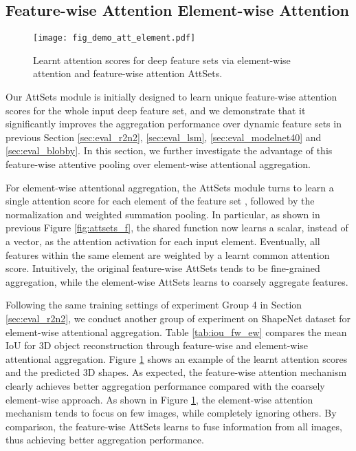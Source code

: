 \documentclass[twocolumn]{svjour3}    \pdfoutput=1
\newcommand{\nickname}{AttSets}
\begin{document}
\vspace{-0.45cm}
\subsection{Feature-wise Attention  Element-wise Attention}
\begin{figure}\vspace{-0.15cm}
\centering
   \texttt{[image: fig\_demo\_att\_element.pdf]}
\caption{Learnt attention scores for deep feature sets via element-wise attention and feature-wise attention \nickname{}.}
\label{fig:atts_ele}
\vspace{-0.5cm}
\end{figure}

Our \nickname{} module is initially designed to learn unique feature-wise attention scores for the whole input deep feature set, and we demonstrate that it significantly improves the aggregation performance over dynamic feature sets in previous Section \ref{sec:eval_r2n2}, \ref{sec:eval_lsm}, \ref{sec:eval_modelnet40} and \ref{sec:eval_blobby}. In this section, we further investigate the advantage of this feature-wise attentive pooling over element-wise attentional aggregation.

For element-wise attentional aggregation, the \nickname{} module turns to learn a single attention score for each element of the feature set , followed by the  normalization and weighted summation pooling. In particular, as shown in previous Figure \ref{fig:attsets_f}, the shared function  now learns a scalar, instead of a vector, as the attention activation for each input element. Eventually, all features within the same element are weighted by a learnt common attention score. Intuitively, the original feature-wise \nickname{} tends to be fine-grained aggregation, while the element-wise \nickname{} learns to coarsely aggregate features.

Following the same training settings of experiment Group 4 in Section \ref{sec:eval_r2n2}, we conduct another group of experiment on ShapeNet dataset for element-wise attentional aggregation. Table \ref{tab:iou_fw_ew} compares the mean IoU for 3D object reconstruction through feature-wise and element-wise attentional aggregation. Figure \ref{fig:atts_ele} shows an example of the learnt attention scores and the predicted 3D shapes. As expected, the feature-wise attention mechanism clearly achieves better aggregation performance compared with the coarsely element-wise approach. As shown in Figure \ref{fig:atts_ele}, the element-wise attention mechanism tends to focus on few images, while completely ignoring others. By comparison, the feature-wise \nickname{} learns to fuse information from all images, thus achieving better aggregation performance.
\end{document}
